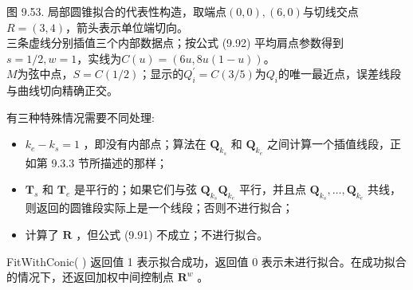 \documentclass[../main.tex]{subfiles}
\begin{document}
\begin{center}
\begin{minipage}{26cm}
\vspace*{.6\baselineskip}
\centering
{}
\par\smallskip
图 9.53. 局部圆锥拟合的代表性构造，取端点$(0,0),(6,0)$与切线交点$R=(3,4)$，箭头表示单位端切向。\\
三条虚线分别插值三个内部数据点；按公式 (9.92) 平均肩点参数得到$s=1/2,w=1$，实线为$C(u)=(6u,8u(1-u))$。\\
$M$为弦中点，$S=C(1/2)$；显示的$Q_i^{\prime}=C(3/5)$为$Q_i$的唯一最近点，误差线段与曲线切向精确正交。
\end{minipage}
\end{center}

有三种特殊情况需要不同处理:

\begin{itemize}
\item \({k}_{e} - {k}_{s} = 1\) ，即没有内部点；算法在 \({\mathbf{Q}}_{{k}_{s}}\) 和 \({\mathbf{Q}}_{{k}_{e}}\) 之间计算一个插值线段，正如第 9.3.3 节所描述的那样；
\end{itemize}

\begin{itemize}
\item \({\mathbf{T}}_{s}\) 和 \({\mathbf{T}}_{e}\) 是平行的；如果它们与弦 \({\mathbf{Q}}_{{k}_{s}}{\mathbf{Q}}_{{k}_{e}}\) 平行，并且点 \({\mathbf{Q}}_{{k}_{s}},\ldots ,{\mathbf{Q}}_{{k}_{e}}\) 共线，则返回的圆锥段实际上是一个线段；否则不进行拟合；
\end{itemize}

\begin{itemize}
\item 计算了 \(\mathbf{R}\) ，但公式 (9.91) 不成立；不进行拟合。
\end{itemize}

FitWithConic( ) 返回值 1 表示拟合成功，返回值 0 表示未进行拟合。在成功拟合的情况下，还返回加权中间控制点 \({\mathbf{R}}^{w}\) 。
\end{document}
